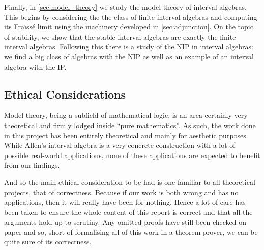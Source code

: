 Finally, in \cref{sec:model_theory} we study the model theory of interval algebras. This
begins by considering the the class of finite interval algebras and computing its
Fraïssé limit using the machinery developed in \cref{sec:adjunction}. On the topic of
stability, we show that the stable interval algebras are exactly the finite interval
algebras. Following this there is a study of the NIP in interval algebras: 
we find a big class of algebras with the NIP as well as an example of an interval algebra with the
IP.

\subsection{Ethical Considerations}

Model theory, being a subfield of mathematical logic, is an area certainly very theoretical and
firmly lodged inside ``pure mathematics''. As such, the work done in this project has been
entirely theoretical and mainly for aesthetic purposes. While Allen's interval algebra is a very
concrete construction with a lot of possible real-world applications, none of these applications
are expected to benefit from our findings.

And so the main ethical consideration to be had is one familiar to all theoretical projects, that
of correctness. Because if our work is both wrong and has no applications, then it will really
have been for nothing. Hence a lot of care has been taken to ensure the whole content of this report
is correct and that all the arguments hold up to scrutiny. Any omitted proofs have still been
checked on paper and so, short of formalising all of this work in a theorem prover, we can be quite
sure of its correctness.
